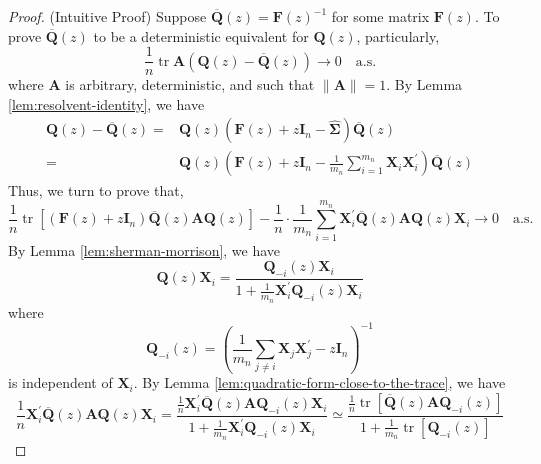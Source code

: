 \begin{proof}
    (Intuitive Proof) Suppose $\overline{\mathbf{Q}}(z)=\mathbf{F}(z)^{-1}$ for some matrix $\mathbf{F}(z)$. To prove $\overline{\mathbf{Q}}(z)$ to be a deterministic equivalent for $\mathbf{Q}(z)$, particularly,
    \begin{equation*}
        \frac{1}{n}\operatorname{tr}\mathbf{A}(\mathbf{Q}(z)-\overline{\mathbf{Q}}(z))\rightarrow 0\quad\text{a.s.}
    \end{equation*}
    where $\mathbf{A}$ is arbitrary, deterministic, and such that $\|\mathbf{A}\|=1$. By Lemma \ref{lem:resolvent-identity}, we have
    \begin{equation*}
        \begin{aligned}
            \mathbf{Q}(z)-\overline{\mathbf{Q}}(z)= & \mathbf{Q}(z)\left(\mathbf{F}(z)+z\mathbf{I}_{n}-\widehat{\boldsymbol{\Sigma}}\right) \overline{\mathbf{Q}}(z)                                         \\
            =                                       & \mathbf{Q}(z)\left(\mathbf{F}(z)+z\mathbf{I}_{n}-\frac{1}{m_{n}}\sum_{i=1}^{m_{n}}\mathbf{X}_{i}\mathbf{X}_{i}^{\prime}\right)\overline{\mathbf{Q}}(z)
        \end{aligned}
    \end{equation*}
    Thus, we turn to prove that,
    \begin{equation*}
        \frac{1}{n}\operatorname{tr}\left[\left(\mathbf{F}(z)+z\mathbf{I}_{n}\right)\overline{\mathbf{Q}}(z)\mathbf{A}\mathbf{Q}(z)\right]-\frac{1}{n}\cdot\frac{1}{m_{n}}\sum_{i=1}^{m_{n}}\mathbf{X}_{i}^{\prime}\overline{\mathbf{Q}}(z)\mathbf{A}\mathbf{Q}(z)\mathbf{X}_{i}\rightarrow 0\quad\text{a.s.}
    \end{equation*}
    By Lemma \ref{lem:sherman-morrison}, we have
    \begin{equation*}
        \mathbf{Q}(z)\mathbf{X}_{i}=\frac{\mathbf{Q}_{-i}(z)\mathbf{X}_{i}}{1+\frac{1}{m_{n}}\mathbf{X}_{i}^{\prime}\mathbf{Q}_{-i}(z)\mathbf{X}_{i}}
    \end{equation*}
    where
    \begin{equation*}
        \mathbf{Q}_{-i}(z)=\left(\frac{1}{m_{n}}\sum_{j\neq i}\mathbf{X}_{j}\mathbf{X}_{j}^{\prime}-z\mathbf{I}_{n}\right)^{-1}
    \end{equation*}
    is independent of $\mathbf{X}_{i}$. By Lemma \ref{lem:quadratic-form-close-to-the-trace}, we have
    \begin{equation*}
        \frac{1}{n}\mathbf{X}_{i}^{\prime}\overline{\mathbf{Q}}(z)\mathbf{A}\mathbf{Q}(z)\mathbf{X}_{i}=\frac{\frac{1}{n}\mathbf{X}_{i}^{\prime}\overline{\mathbf{Q}}(z)\mathbf{A}\mathbf{Q}_{-i}(z)\mathbf{X}_{i}}{1+\frac{1}{m_{n}}\mathbf{X}_{i}^{\prime}\mathbf{Q}_{-i}(z)\mathbf{X}_{i}}\simeq\frac{\frac{1}{n}\operatorname{tr}\left[\overline{\mathbf{Q}}(z)\mathbf{A}\mathbf{Q}_{-i}(z)\right]}{1+\frac{1}{m_{n}}\operatorname{tr}\left[\mathbf{Q}_{-i}(z)\right]}

\end{equation*}
\end{proof}
